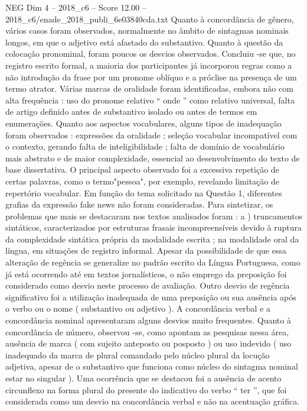 \begin{textsample}{NEG Dim 4 – 2018\_c6 – Score 12.00 – 2018\_c6/enade\_2018\_publi\_6e03840cda.txt}
Quanto à concordância de gênero, vários casos foram observados, normalmente no âmbito de sintagmas nominais longos, em que o adjetivo está afastado do substantivo.
Quanto à questão da colocação pronominal, foram poucos os desvios observados.
Concluiu -se que, no registro escrito formal, a maioria dos participantes já incorporou regras como a não introdução da frase por um pronome oblíquo e a próclise na presença de um termo atrator.
Várias marcas de oralidade foram identificadas, embora não com alta frequência : uso do pronome relativo “ onde ” como relativo universal, falta de artigo definido antes de substantivo isolado ou antes de termos em enumerações.
Quanto aos aspectos vocabulares, alguns tipos de inadequação foram observados : expressões da oralidade ; seleção vocabular incompatível com o contexto, gerando falta de inteligibilidade ; falta de domínio de vocabulário mais abstrato e de maior complexidade, essencial ao desenvolvimento do texto de base dissertativa.
O principal aspecto observado foi a excessiva repetição de certas palavras, como o termo"pessoa", por exemplo, revelando limitação de repertório vocabular.
Em função do tema solicitado na Questão 1, diferentes grafias da expressão fake news não foram consideradas.
Para sintetizar, os problemas que mais se destacaram nos textos analisados foram : a ) truncamentos sintáticos, caracterizados por estruturas frasais incompreensíveis devido à ruptura da complexidade sintática própria da modalidade escrita ; na modalidade oral da língua, em situações de registro informal.
Apesar da possibilidade de que essa alteração de regência se generalize no padrão escrito da Língua Portuguesa, como já está ocorrendo até em textos jornalísticos, o não emprego da preposição foi considerado como desvio neste processo de avaliação.
Outro desvio de regência significativo foi a utilização inadequada de uma preposição ou sua ausência após o verbo ou o nome ( substantivo ou adjetivo ).
A concordância verbal e a concordância nominal apresentaram alguns desvios muito frequentes.
Quanto à concordância de número, observou -se, como apontam as pesquisas nessa área, ausência de marca ( com sujeito anteposto ou posposto ) ou uso indevido ( uso inadequado da marca de plural comandado pelo núcleo plural da locução adjetiva, apesar de o substantivo que funciona como núcleo do sintagma nominal estar no singular ).
Uma ocorrência que se destacou foi a ausência de acento circunflexo na forma plural do presente do indicativo do verbo “ ter ”, que foi considerada como um desvio na concordância verbal e não na acentuação gráfica.

\end{textsample}
